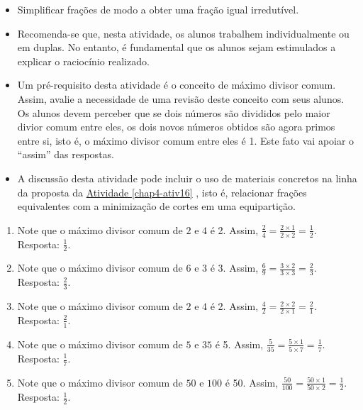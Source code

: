 \begin{atividade}\label{chap4-ativ17}
\objetivos
\begin{itemize} %
    \item       Simplificar frações de modo a obter uma fração igual
irredutível.
\end{itemize} %

\discussoes
\begin{itemize} %
    \item       Recomenda-se que, nesta atividade, os alunos trabalhem
individualmente ou em duplas. No entanto, é fundamental que os alunos sejam
estimulados a explicar o raciocínio realizado.
    \item       Um pré-requisito desta atividade é o conceito de máximo divisor
comum. Assim, avalie a necessidade de uma revisão deste conceito com seus
alunos. Os alunos devem perceber que se dois números são divididos pelo maior
divior comum entre eles, os dois novos números obtidos são agora primos entre
si, isto é, o máximo divisor comum entre eles é 1. Este fato vai apoiar o
``assim''       das respostas.
    \item       A discussão desta atividade pode incluir o uso de materiais
concretos na linha da proposta da \hyperref[chap4-ativ16]{Atividade \ref{chap4-ativ16}}      , isto é, relacionar
frações equivalentes com a minimização de cortes em uma equipartição.
\end{itemize} %

\solucao
\begin{enumerate}
 \item Note que o máximo divisor comum de   $2$   e   $4$   é 2. Assim,
$\frac{2}{4} = \frac{2 \times 1}{2 \times 2} = \frac{1}{2}$. Resposta:
$\frac{1}{2}$.
 \item Note que o máximo divisor comum de   $6$   e   $3$   é 3. Assim,
$\frac{6}{9} = \frac{3 \times 2}{3 \times 3} = \frac{2}{3}$. Resposta:
$\frac{2}{3}$.
 \item Note que o máximo divisor comum de   $2$   e   $4$   é 2. Assim,
$\frac{4}{2} = \frac{2 \times 2}{2 \times 1} = \frac{2}{1}$. Resposta:
$\frac{2}{1}$.
 \item Note que o máximo divisor comum de   $5$   e   $35$   é 5. Assim,
$\frac{5}{35} = \frac{5 \times 1}{5 \times 7} = \frac{1}{7}$. Resposta:
$\frac{1}{7}$.
 \item Note que o máximo divisor comum de   $50$   e   $100$   é 50. Assim,
$\frac{50}{100} = \frac{50 \times 1}{50 \times 2} = \frac{1}{2}$. Resposta:
$\frac{1}{2}$.
\end{enumerate}

\end{atividade}

